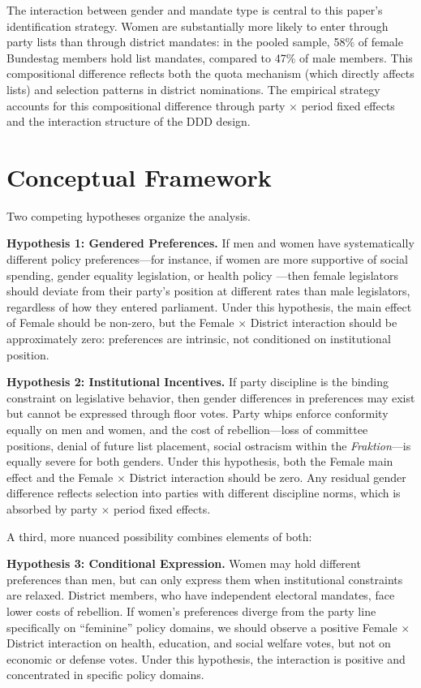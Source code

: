 \documentclass[12pt]{article}
\begin{document}
The interaction between gender and mandate type is central to this paper's identification strategy. Women are substantially more likely to enter through party lists than through district mandates: in the pooled sample, 58\% of female Bundestag members hold list mandates, compared to 47\% of male members. This compositional difference reflects both the quota mechanism (which directly affects lists) and selection patterns in district nominations. The empirical strategy accounts for this compositional difference through party $\times$ period fixed effects and the interaction structure of the DDD design.


\section{Conceptual Framework}\label{sec:framework}

Two competing hypotheses organize the analysis.

\textbf{Hypothesis 1: Gendered Preferences.} If men and women have systematically different policy preferences---for instance, if women are more supportive of social spending, gender equality legislation, or health policy \citep{washington2008, chattopadhyay2004}---then female legislators should deviate from their party's position at different rates than male legislators, regardless of how they entered parliament. Under this hypothesis, the main effect of Female should be non-zero, but the Female $\times$ District interaction should be approximately zero: preferences are intrinsic, not conditioned on institutional position.

\textbf{Hypothesis 2: Institutional Incentives.} If party discipline is the binding constraint on legislative behavior, then gender differences in preferences may exist but cannot be expressed through floor votes. Party whips enforce conformity equally on men and women, and the cost of rebellion---loss of committee positions, denial of future list placement, social ostracism within the \textit{Fraktion}---is equally severe for both genders. Under this hypothesis, both the Female main effect and the Female $\times$ District interaction should be zero. Any residual gender difference reflects selection into parties with different discipline norms, which is absorbed by party $\times$ period fixed effects.

A third, more nuanced possibility combines elements of both:

\textbf{Hypothesis 3: Conditional Expression.} Women may hold different preferences than men, but can only express them when institutional constraints are relaxed. District members, who have independent electoral mandates, face lower costs of rebellion. If women's preferences diverge from the party line specifically on ``feminine'' policy domains, we should observe a positive Female $\times$ District interaction on health, education, and social welfare votes, but not on economic or defense votes. Under this hypothesis, the interaction is positive and concentrated in specific policy domains.
\end{document}
